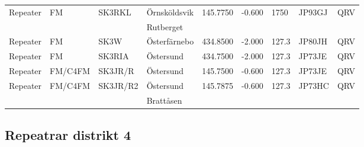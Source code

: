 \begin{landscape}
\begin{longtable}{llllrrlll}
Repeater   & FM         & SK3RKL   & Örnsköldsvik     & 145.7750    & -0.600   & 1750       & JP93GJ & QRV  \\
           &            &          & Rutberget        &             &          &            &        &      \\
Repeater   & FM         & SK3W     & Österfärnebo     & 434.8500    & -2.000   & 127.3      & JP80JH & QRV  \\
Repeater   & FM         & SK3RIA   & Östersund        & 434.7500    & -2.000   & 127.3      & JP73JE & QRV  \\
Repeater   & FM/C4FM    & SK3JR/R  & Östersund        & 145.7500    & -0.600   & 127.3      & JP73JE & QRV  \\
Repeater   & FM/C4FM    & SK3JR/R2 & Östersund        & 145.7875    & -0.600   & 127.3      & JP73HC & QRV  \\
           &            &          & Brattåsen        &             &          &            &        &      \\
\end{longtable}


\clearpage

\subsection{Repeatrar distrikt 4}



\end{landscape}
